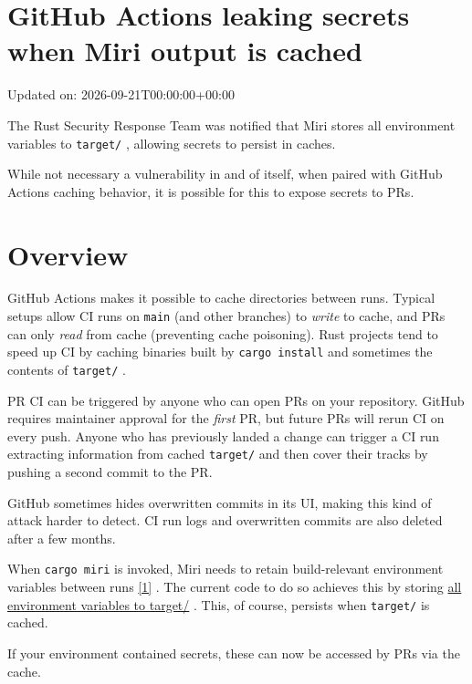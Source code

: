 \documentclass[11pt,a4paper]{article}
\begin{document}
\section{GitHub Actions leaking secrets when Miri output is cached}

Updated on: 2026-09-21T00:00:00+00:00

The Rust Security Response Team was notified that Miri stores all environment variables to \texttt{target/} , allowing secrets to persist in caches.

While not necessary a vulnerability in and of itself, when paired with GitHub Actions caching behavior, it is possible for this to expose secrets to PRs.

\section{Overview}

GitHub Actions makes it possible to cache directories between runs. Typical setups allow CI runs on \texttt{main} (and other branches) to \textit{write} to cache, and PRs can only \textit{read} from cache (preventing cache poisoning). Rust projects tend to speed up CI by caching binaries built by \texttt{cargo install} and sometimes the contents of \texttt{target/} .

PR CI can be triggered by anyone who can open PRs on your repository. GitHub requires maintainer approval for the \textit{first} PR, but future PRs will rerun CI on every push. Anyone who has previously landed a change can trigger a CI run extracting information from cached \texttt{target/} and then cover their tracks by pushing a second commit to the PR.

GitHub sometimes hides overwritten commits in its UI, making this kind of attack harder to detect. CI run logs and overwritten commits are also deleted after a few months.

When \texttt{cargo miri} is invoked, Miri needs to retain build-relevant environment variables between runs \href{https://blog.rust-lang.org/2026/09/21/github-actions-leaking-secrets-when-miri-output-is-cached/\#fn-1}{[1]} . The current code to do so achieves this by storing \href{https://github.com/rust-lang/miri/blob/165a9c3c96f0f4e6232278e62cb64648215bbc37/cargo-miri/src/util.rs\#L40-L42}{all environment variables to target/} . This, of course, persists when \texttt{target/} is cached.

If your environment contained secrets, these can now be accessed by PRs via the cache.
\end{document}
